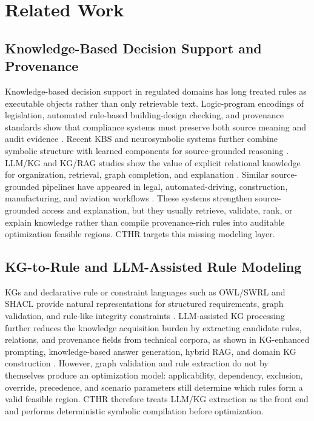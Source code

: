 ﻿\documentclass[a4paper,fleqn]{cas-dc}
\newcommand{\CTHR}{\textsc{CTHR}}
\begin{document}
\section{Related Work}
\label{sec:related}

\subsection{Knowledge-Based Decision Support and Provenance}
Knowledge-based decision support in regulated domains has long treated rules as executable objects rather than only retrievable text. Logic-program encodings of legislation, automated rule-based building-design checking, and provenance standards show that compliance systems must preserve both source meaning and audit evidence \cite{sergot1986british,eastman2009automatic,moreau2013provdm}. Recent KBS and neurosymbolic systems further combine symbolic structure with learned components for source-grounded reasoning \cite{amador2024neurosymbolic,some2025comprehensive}. LLM/KG and KG/RAG studies show the value of explicit relational knowledge for organization, retrieval, graph completion, and explanation \cite{pan2024llmkgroadmap,dai2025llmkg,yang2024cpkgc,jin2024llmgraphs,huang2025promptkg}. Similar source-grounded pipelines have appeared in legal, automated-driving, construction, manufacturing, and aviation workflows \cite{hindi2025legalrag,hussien2025roadusers,lee2024constructionsafety,wan2025hragmanufacturing,xiong2025drrag}. These systems strengthen source-grounded access and explanation, but they usually retrieve, validate, rank, or explain knowledge rather than compile provenance-rich rules into auditable optimization feasible regions. \CTHR{} targets this missing modeling layer.

\subsection{KG-to-Rule and LLM-Assisted Rule Modeling}
KGs and declarative rule or constraint languages such as OWL/SWRL and SHACL provide natural representations for structured requirements, graph validation, and rule-like integrity constraints \cite{horrocks2004swrl,pan2017exploiting,knublauch2017shacl}. LLM-assisted KG processing further reduces the knowledge acquisition burden by extracting candidate rules, relations, and provenance fields from technical corpora, as shown in KG-enhanced prompting, knowledge-based answer generation, hybrid RAG, and domain KG construction \cite{liu2025adaptqa,zhou2026ichrag,chen2026dairygoatqa}. However, graph validation and rule extraction do not by themselves produce an optimization model: applicability, dependency, exclusion, override, precedence, and scenario parameters still determine which rules form a valid feasible region. \CTHR{} therefore treats LLM/KG extraction as the front end and performs deterministic symbolic compilation before optimization.
\end{document}

